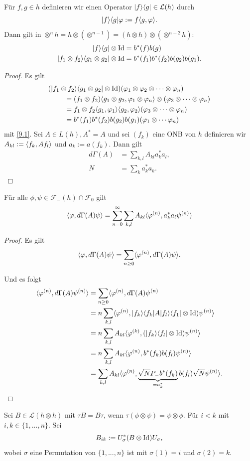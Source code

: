\documentclass{mycourse}
\begin{document}
Für $f,g \in h$ definieren wir einen Operator $| f \rangle \langle g| \in \mathcal L(h)$ durch
\[
|f\rangle \langle g| \varphi := f\langle g, \varphi \rangle.
\]
Dann gilt in $\otimes^n h= h \otimes (\otimes^{n-1})=(h\otimes h) \otimes (\otimes^{n-2}h)$:
\begin{equation}\label{9.1}
\begin{aligned}
  |f\rangle \langle g| \otimes \operatorname{Id} &= b^*(f) b(g)\\
  |f_1 \otimes f_2 \rangle \langle g_1 \otimes g_2| \otimes \operatorname{Id} &= b^*(f_1) b^*(f_2) b(g_2) b(g_1).
\end{aligned}
\end{equation}
\begin{proof}
Es gilt
\begin{align*}
&( |f_1 \otimes f_2\rangle \langle g_1 \otimes g_2 | \otimes \operatorname{Id}) (\varphi_1 \otimes \varphi_2 \otimes \cdots \otimes \varphi_n)\\
&\ \qquad= (f_1 \otimes f_2) \langle g_1 \otimes g_2, \varphi_1 \otimes \varphi_n\rangle \otimes(\varphi_3 \otimes \cdots \otimes \varphi_n)\\
&\ \qquad= f_1 \otimes f_2 \langle g_1, \varphi_1\rangle \langle g_2, \varphi_2\rangle (\varphi_3 \otimes \cdots \otimes \varphi_n)\\
&\ \qquad= b^*(f_1) b^*(f_2) b(g_2) b(g_1) (\varphi_1 \otimes \cdots  \varphi_n)
\end{align*}
mit \eqref{9.1}.
Sei $A\in L(h), A^*=A$ und sei $(f_k)$ eine ONB von $h$ definieren wir $A_{kl} := \langle f_k, A f_l\rangle$ und $a_k := a(f_k)$. Dann gilt
\begin{align*}
d\Gamma(A) &= \sum_{k,l} A_{kl} a_k^* a_l,\\
N &= \sum_k a_k^* a_k.
\end{align*}

\end{proof}
\begin{st}
Für alle $\phi, \psi\in \mathcal F_-(h) \cap \mathcal F_0$ gilt
\[
\langle \varphi, d\Gamma(A) \psi \rangle = \sum_{n=0}^\infty \sum_{k,l} A_{kl} \langle \varphi^{(n)}, a_k^* a_l \psi^{(n)})
\]
\end{st}
\begin{proof}
Es gilt
\[
\langle \varphi, d\Gamma(A) \psi\rangle = \sum_{n\ge 0} \langle \varphi^{(n)}, d\Gamma(A) \psi\rangle.
\]

Und es folgt
\begin{align*}
\langle \varphi^{(n)}, d\Gamma(A) \psi^{(n)}\rangle &= \sum_{n\ge 0} \langle \varphi^{(n)}, d\Gamma(A) \psi^{(n)}\\
&= n \sum_{k,l} \langle \varphi^{(n)} , |f_k \rangle \langle f_k | A|f_l\rangle \langle f_1 | \otimes \operatorname{Id}) \psi^{(n)}\rangle\\
&= n \sum_{k,l} A_{kl} \langle \varphi^{(k)}, ( |f_k \rangle \langle f_l| \otimes \operatorname{Id}) \psi^{(n)}\rangle \\
&= n \sum_{k,l} A_{kl} \langle\varphi^{(n)},b^*(f_k) b(f_l) \psi^{(n)}\rangle \\
&= \sum_{k,l} A_{kl}\langle \varphi^{(n)}, \underbrace{\sqrt{N} P_- b^*(f_k)}_{=a_k^*}  b(f_l) \sqrt{N} \psi^{(n)}\rangle.
\end{align*}
\end{proof}
Sei $B\in \mathcal L(h\otimes h)$ mit $\tau B = B \tau$, wenn $\tau(\phi \otimes \psi) = \psi \otimes \phi$. Für $i<k$ mit $i,k\in \{1,...,n\}$. Sei
\[
B_{ik} := U_\sigma^*(B\otimes \operatorname{Id}) U_\sigma,
\] 
wobei $\sigma$ eine Permutation von $\{1,..., n\}$ ist mit $\sigma(1) =i$ und $\sigma(2)=k$.
\end{document}
